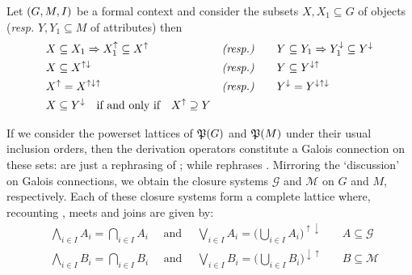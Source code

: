 \begin{proposition}
  \label{proposition:derivation-operators-galois} Let $(G,M,\mathrel{I})$ be a formal context and consider the subsets $X,X_{1}\subseteq G$ of objects (\textit{resp.} $Y,Y_{1}\subseteq M$ of attributes) then
  \begin{align}
     & X \subseteq X_{1}\Rightarrow X_{1}^{\uparrow}\subseteq X^{\uparrow} & \textit{(resp.)}         & \qquad Y \subseteq Y_{1}\Rightarrow Y_{1}^{\downarrow}\subseteq Y^{\downarrow}\label{equation:galois-1} \\
     & X \subseteq X^{\uparrow \downarrow}                                 & \textit{(resp.)}         & \qquad Y \subseteq Y^{\downarrow \uparrow}\label{equation:galois-2}                                     \\
     & X^{\uparrow}= X^{\uparrow \downarrow \uparrow}                      & \textit{(resp.)}         & \qquad Y^{\downarrow}= Y^{\downarrow \uparrow \downarrow}\label{equation:galois-3}                      \\
     & X \subseteq Y^{\downarrow}\quad \text{if and only if}\quad X^{\uparrow}\supseteq Y             & \label{equation:galois-4}
  \end{align}
\end{proposition}

If we consider the powerset lattices of $\mathfrak{P}({G})$ and $\mathfrak{P}({M})$ under their usual inclusion orders, then the derivation operators constitute a Galois connection on these sets:
 are just a rephrasing of ; while  rephrases
. Mirroring the `discussion' on Galois connections, we obtain the closure systems $\mathcal{G}$ and $\mathcal{M}$ on $G$ and $M$, respectively. Each of these closure
systems form a complete lattice where, recounting , meets and joins are given by:
%
\begin{align*}
   & \underset{i \in I}\bigwedge A_{i}= \underset{i \in I}\bigcap A_{i}\quad \text{ and }\quad \underset{i \in I}\bigvee A_{i}= \big(\underset{i \in I}\bigcup A_{i}\big)^{\uparrow \downarrow} & \quad A\subseteq \mathcal{G} \\
   & \underset{i \in I}\bigwedge B_{i}= \underset{i \in I}\bigcap B_{i}\quad \text{ and }\quad\underset{i \in I}\bigvee B_{i}= \big( \underset{i \in I}\bigcup B_{i}\big)^{\downarrow \uparrow} & \quad B\subseteq \mathcal{M}
\end{align*}

